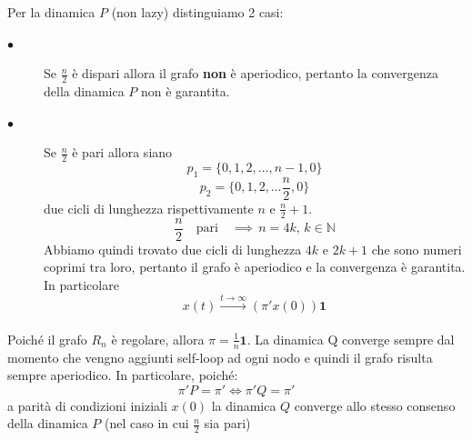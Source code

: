 \begin{alphaparts}
   \questionpart
   Per la dinamica \(P\) (non lazy) distinguiamo 2 casi:
   \begin{description}
       \item[\(\bullet\)] Se \(\frac{n}{2}\) è dispari allora il grafo \textbf{non} è aperiodico, pertanto la convergenza della dinamica \(P\) non è garantita.
       \item[\(\bullet\)] Se \(\frac{n}{2}\) è pari allora siano 
       \[p_1 = \{0,1,2, \dots ,n - 1, 0\}\] 
       \[p_2 = \{0,1,2, \dots \frac{n}{2}, 0\}\]
       due cicli di lunghezza rispettivamente \(n\) e \(\frac{n}{2} + 1\).
       \[\frac{n}{2}  \quad \text{pari} \quad \implies\, n= 4k,\,k\in \mathbb{N}\]
       Abbiamo quindi trovato due cicli di lunghezza \(4k\) e \(2k + 1\) che sono numeri coprimi tra loro, pertanto il grafo è aperiodico e la convergenza è garantita. In particolare
       \[x(t) \xrightarrow[]{t \to \infty} (\pi 'x(0)) \mathbf{1}\]
   \end{description} 
   Poiché il grafo \(R_n\) è regolare, allora \(\pi = \frac{1}{n} \mathbf{1}\). La dinamica Q converge sempre dal momento che vengno aggiunti self-loop ad ogni nodo e quindi il grafo risulta sempre aperiodico. In particolare, poiché:
   \[\pi' P = \pi' \iff \pi'Q = \pi'\]
   a parità di condizioni iniziali \(x(0)\) la dinamica \(Q\) converge allo stesso consenso della dinamica \(P\) (nel caso in cui \(\frac{n}{2}\) sia pari)


\end{alphaparts}
